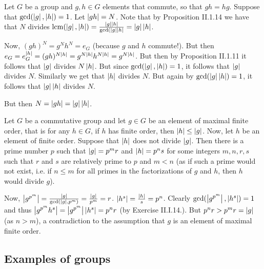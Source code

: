 \begin{problem}
\end{problem}

\begin{solution}
	Let $G$ be a group and $g,h \in G$ elements that commute, so that $gh = hg$. Suppose that $\gcd(\left|g\right|,\left|h\right|)=1$. Let $\left|gh\right|=N$. Note that by Proposition II.1.14 we have that $N$ divides $\operatorname{lcm}(\left|g\right|,\left|h\right|)=\frac{\left|g\right|\left|h\right|}{\gcd(\left|g\right|\left|h\right|}=\left|g\right|\left|h\right|$.
	
	Now, $(gh)^N=g^Nh^N=e_G$ (because $g$ and $h$ commute!). But then $e_G=e_G^{\left|h\right|}=(gh)^{N \left|h\right|}=g^{N\left|h\right|}h^{N\left|h\right|}=g^{N\left|h\right|}$. But then by Proposition II.1.11 it follows that $\left|g\right|$ divides $N\left|h\right|$. But since $\gcd(\left|g\right|,\left|h\right|)=1$, it follows that $\left|g\right|$ divides $N$. Similarly we get that $\left|h\right|$ divides $N$. But again by $\gcd(\left|g\right|\left|h\right|)=1$, it follows that $\left|g\right|\left|h\right|$ divides $N$.
	
	But then $N = \left|gh\right| = \left|g\right|\left|h\right|$. 
\end{solution}

\begin{problem}
\end{problem}

\begin{solution}
	Let $G$ be a commutative group and let $g \in G$ be an element of maximal finite order, that is for any $h \in G$, if $h$ has finite order, then $\left|h\right| \leq \left|g\right|$. Now, let $h$ be an element of finite order. Suppose that $\left|h\right|$ does not divide $\left|g\right|$. Then there is a prime number $p$ such that $\left|g\right|=p^m r$ and $\left|h\right|=p^n s$ for some integers $m, n, r, s$ such that $r$ and $s$ are relatively prime to $p$ and $m < n$ (as if such a prime would not exist, i.e. if $n \leq m$ for all primes in the factorizations of $g$ and $h$, then $h$ would divide $g$). 
	
	Now, $\left|g^{p^m}\right|=\frac{\left|g\right|}{\gcd(\left|g\right|,p^m)}=\frac{\left|g\right|}{p^m}=r$. $\left|h^s\right|=\frac{\left|h\right|}{s}=p^n$. Clearly $\gcd(\left|g^{p^m}\right|,\left|h^s\right|)=1$ and thus $\left|g^{p^m}h^s\right|=\left|g^{p^m}\right|\left|h^s\right|=p^n r$ (by Exercise II.I.14.). But $p^n r > p^m r = \left|g\right|$ (as $n > m$), a contradiction to the assumption that $g$ is an element of maximal finite order.
\end{solution}

\subsection{Examples of groups}

